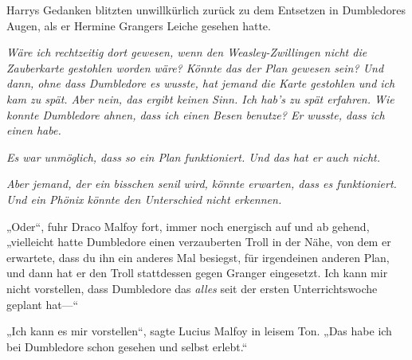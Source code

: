 Harrys Gedanken blitzten unwillkürlich zurück zu dem Entsetzen in Dumbledores Augen, als er Hermine Grangers Leiche gesehen hatte.

\emph{Wäre ich rechtzeitig dort gewesen, wenn den Weasley-Zwillingen nicht die Zauberkarte gestohlen worden wäre? Könnte das der Plan gewesen sein?
Und dann, ohne dass Dumbledore es wusste, hat jemand die Karte gestohlen und ich kam zu spät.
Aber nein, das ergibt keinen Sinn. Ich hab’s zu spät erfahren.
Wie konnte Dumbledore ahnen, dass ich einen Besen benutze?
Er wusste, dass ich einen habe.}


\emph{Es war unmöglich, dass so ein Plan funktioniert. Und das hat er auch nicht.}

\emph{Aber jemand, der ein bisschen senil wird, könnte \emph{erwarten}, dass es funktioniert. Und ein Phönix könnte den Unterschied nicht erkennen.}

„Oder“, fuhr Draco Malfoy fort, immer noch energisch auf und ab gehend, „vielleicht hatte Dumbledore einen verzauberten Troll in der Nähe, von dem er erwartete, dass du ihn ein anderes Mal besiegst, für irgendeinen anderen Plan, und dann hat er den Troll stattdessen gegen Granger eingesetzt. Ich kann mir nicht vorstellen, dass Dumbledore das \emph{alles} seit der ersten Unterrichtswoche geplant hat—“

„Ich kann es mir vorstellen“, sagte Lucius Malfoy in leisem Ton. „Das habe ich bei Dumbledore schon gesehen und selbst erlebt.“

